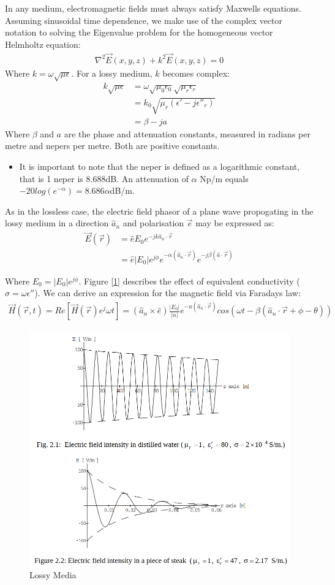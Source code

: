 \documentclass{book}
\begin{document}
In any medium, electromagnetic fields must always satisfy Maxwells equations. Assuming sinusoidal time dependence, we make use of the complex vector notation to solving the Eigenvalue problem for the homogeneous vector Helmholtz equation:
\begin{align*}
	\nabla^2\vec{E} (x,y,z)+k^2\vec{E}(x,y,z)=0
\end{align*}
Where $k=\omega\sqrt{\mu \epsilon}$. For a lossy medium, $k$ becomes complex:
\begin{align*}
	k\sqrt{\mu\epsilon} &= \omega \sqrt{\mu_0 \epsilon_0} \sqrt{\mu_r \epsilon_r} \\
	&=k_0 \sqrt{\mu_r (\epsilon'-j\epsilon''_r)} \\
	&= \beta - ja
\end{align*}
Where $\beta$ and $a$ are the phase and attenuation constants, measured in radians per metre and nepers per metre. Both are positive constants.
\begin{itemize}
	\item It is important to note that the neper is defined as a logarithmic constant, that is 1 neper is $8.688$dB. An attenuation of $\alpha$ Np/m equals $-20log(e^{-\alpha})=8.686 \alpha $dB/m.
\end{itemize}

As in the lossless case, the electric field phasor of a plane wave propogating in the lossy medium in a direction $\hat{a}_n$ and polarisation $\vec{e}$ may be expressed as:
\begin{align*}
	\vec{E}(\vec{r}) &= \hat{e} E_0 e^{-jk \hat{a}_n \cdot \vec{r}} \\
	&= \hat{e} |E_0| e^{j\phi} e^{-\alpha(\hat{a}_n \cdot \vec{r})}e^{-j \beta (\hat{a} \cdot \vec{r})}
\end{align*}

Where $E_0 = |E_0| e^{j \phi}$. Figure [\ref{fig:lossymedia}] describes the effect of equivalent conductivity ($\sigma= \omega \epsilon''$). We can derive an expression for the magnetic field via Faradays law:
\begin{align*}
	\vec{H} (\vec{r},t) = Re[\vec{H}(\vec{r})e^j\omega t] = (\hat{a}_n \times \hat{e}) \frac{|E_0|}{|n|} e^{-a(\hat{a}_n \cdot \vec{r})} cos(\omega t - \beta(\hat{a}_n \cdot \vec{r} + \phi - \theta))
\end{align*}

\begin{figure}[h]
	\centering
	\includegraphics[width=0.6\linewidth]{Screenshots/lossy_media}
	\caption{Lossy Media}
	\label{fig:lossymedia}
\end{figure}
\end{document}
